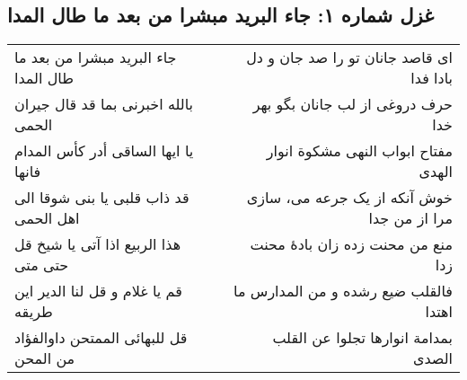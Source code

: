 \begin{center}
\section*{غزل شماره ۱: جاء البرید مبشرا من بعد ما طال المدا}
\label{sec:001}
\begin{longtable}{l p{0.5cm} r}
جاء البرید مبشرا من بعد ما طال المدا
&&
ای قاصد جانان تو را صد جان و دل بادا فدا
\\
بالله اخبرنی بما قد قال جیران الحمی
&&
حرف دروغی از لب جانان بگو بهر خدا
\\
یا ایها الساقی أدر کأس المدام فانها
&&
مفتاح ابواب النهی مشکوة انوار الهدی
\\
قد ذاب قلبی یا بنی شوقا الی اهل الحمی
&&
خوش آنکه از یک جرعه می، سازی مرا از من جدا
\\
هذا الربیع اذا آتی یا شیخ قل حتی متی
&&
منع من محنت زده زان بادهٔ محنت زدا
\\
قم یا غلام و قل لنا الدیر این طریقه
&&
فالقلب ضیع رشده و من المدارس ما اهتدا
\\
قل للبهائی الممتحن داوالفؤاد من المحن
&&
بمدامة انوارها تجلوا عن القلب الصدی
\\
\end{longtable}
\end{center}
